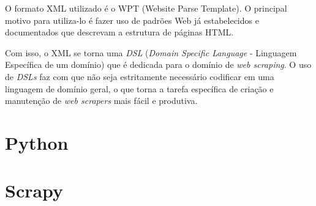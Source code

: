 O formato XML utilizado é o WPT (Website Parse Template)\cite{wpt}. O principal motivo para utiliza-lo é fazer uso de padrões Web já estabelecidos e documentados que descrevam a estrutura de páginas HTML.

Com isso, o XML se torna uma \emph{DSL} (\emph{Domain Specific Language} - Linguagem Específica de um domínio) que é dedicada para o domínio de \emph{web scraping}. O uso de \emph{DSLs} faz com que não seja estritamente necessário codificar em uma linguagem de domínio geral, o que torna a tarefa específica de criação e manutenção de \emph{web scrapers} mais fácil e produtiva.

\section{Python}


\section{Scrapy}

